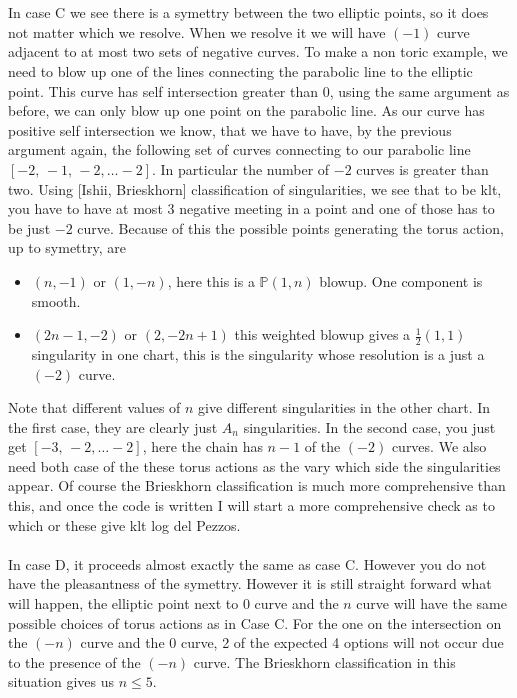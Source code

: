 \documentclass[11pt]{report}
\theoremstyle{definition}
\theoremstyle{definition}
\theoremstyle{definition}
\theoremstyle{definition}
\theoremstyle{definition}
\theoremstyle{definition}
\theoremstyle{definition}
\begin{document}
\\
\\
In case C we see there is a symettry between the two elliptic points, so it does not matter which we resolve. When we resolve it we will have $(-1)$ curve adjacent to at most two sets of negative curves. To make a non toric example, we need to blow up one of the lines connecting the parabolic line to the elliptic point. This curve has self intersection greater than 0, using the same argument as before, we can only blow up one point on the parabolic line. As our curve has positive self intersection we know, that we have to have, by the previous argument again, the following set of curves connecting to our parabolic line $[-2, \, -1, \,  -2, \dots -2 ]$. In particular the number of $-2$ curves is greater than two. Using [Ishii, Brieskhorn] classification of singularities, we see that to be klt, you have to have at most 3 negative meeting in a point and one of those has to be just $-2$ curve. Because of this the possible points generating the torus action, up to symettry, are 
\\
\begin{itemize}
\item $(n, -1)$ or $(1, -n)$, here this is a $\mathbb{P}(1, n)$ blowup. One component is smooth.
\item $(2n - 1, -2)$ or $(2, -2n+1)$ this weighted blowup gives a $\frac{1}{2}(1,1)$ singularity in one chart, this is the singularity whose resolution is a just a $(-2)$ curve. 
\end{itemize}
Note that different values of $n$ give different singularities in the other chart. In the first case, they are clearly just $A_n$ singularities. In the second case, you just get $[-3, \, -2, \dots -2]$, here the chain has $n-1$ of the $(-2)$ curves. We also need both case of the these torus actions as the vary which side the singularities appear. Of course the Brieskhorn classification is much more comprehensive than this, and once the code is written I will start a more comprehensive check as to which or these give klt log del Pezzos. 
\\
\\
In case D, it proceeds almost exactly the same as case C. However you do not have the pleasantness of the symettry. However it is still straight forward what will happen, the elliptic point next to $0$ curve and the $n$ curve will have the same possible choices of torus actions as in Case C. For the one on the intersection on the $(-n)$ curve and the 0 curve, 2 of the expected 4 options will not occur due to the presence of the $(-n)$ curve. The Brieskhorn classification in this situation gives us $n \leq 5$.
\end{document}
